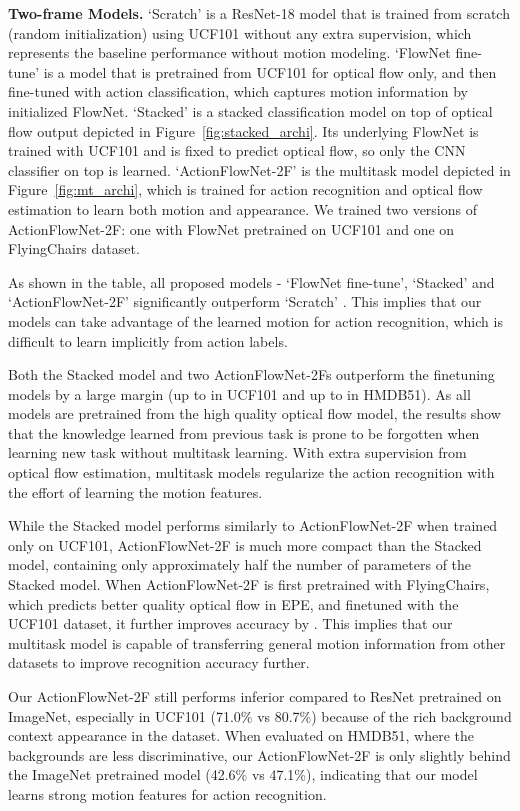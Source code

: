 \documentclass[10pt,twocolumn,letterpaper]{article}
\begin{document}
\textbf{Two-frame Models.}
`Scratch' is a ResNet-18 model that is trained from scratch (random initialization) using UCF101 without any extra supervision, which represents the baseline performance without motion modeling.
`FlowNet fine-tune' is a model that is pretrained from UCF101 for optical flow only, and then fine-tuned with action classification, which captures motion information by initialized FlowNet.
`Stacked' is a stacked classification model on top of optical flow output depicted in Figure~\ref{fig:stacked_archi}. Its underlying FlowNet is trained with UCF101 and is fixed to predict optical flow, so only the CNN classifier on top is learned.
`ActionFlowNet-2F' is the multitask model depicted in Figure~\ref{fig:mt_archi}, which is trained for action recognition and optical flow estimation to learn both motion and appearance.
We trained two versions of ActionFlowNet-2F: one with FlowNet pretrained on UCF101 and one on FlyingChairs dataset.

As shown in the table, all proposed models - `FlowNet fine-tune', `Stacked' and `ActionFlowNet-2F' significantly outperform `Scratch' .
This implies that our models can take advantage of the learned motion for action recognition, which is difficult to learn implicitly from action labels.

Both the Stacked model and two ActionFlowNet-2Fs outperform the finetuning models by a large margin (up to  in UCF101 and up to  in HMDB51).
As all models are pretrained from the high quality optical flow model, the results show that the knowledge learned from previous task is prone to be forgotten when learning new task without multitask learning.
With extra supervision from optical flow estimation, multitask models regularize the action recognition with the effort of learning the motion features.

While the Stacked model performs similarly to ActionFlowNet-2F when trained only on UCF101, ActionFlowNet-2F is much more compact than the Stacked model, containing only approximately half the number of parameters of the Stacked model.
When ActionFlowNet-2F is first pretrained with FlyingChairs, which predicts better quality optical flow in EPE, and finetuned with the UCF101 dataset, it further improves accuracy by .
This implies that our multitask model is capable of transferring general motion information from other datasets to improve recognition accuracy further.

Our ActionFlowNet-2F still performs inferior compared to ResNet pretrained on ImageNet, especially in UCF101 (71.0\% vs 80.7\%) because of the rich background context appearance in the dataset. When evaluated on HMDB51, where the backgrounds are less discriminative, our ActionFlowNet-2F is only slightly behind the ImageNet pretrained model (42.6\% vs 47.1\%), indicating that our model learns strong motion features for action recognition. 
\end{document}
